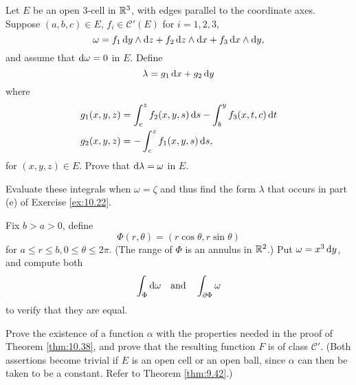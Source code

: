 \begin{myexercise}    
    \label{ex:10.27}
    Let $E$ be an open 3-cell in ${\protect\mathbb R}^3$, with edges parallel to the coordinate axes. 
    Suppose $(a, b, c) \in E$, $f_i \in \mathscr{C}'(E)$ for $i = 1, 2, 3$,
    \begin{equation*}
        \omega = 
        f_1 \d y \wedge \d z + 
        f_2 \d z \wedge \d x + 
        f_3 \d x \wedge \d y ,
    \end{equation*}
    and assume that $\d \omega = 0$ in $E$.
    Define 
    \begin{equation*}
        \lambda = g_1 \d x + g_2 \d y
    \end{equation*}
    where 
    \begin{align*}
        g_1(x,y,z) &= \int_{c}^{z} f_2(x,y,s) \d s - \int_{b}^{y} f_3(x,t,c) \d t \\
        g_2(x,y,z) &= -\int_{c}^{z} f_1(x,y,s) \d s ,
    \end{align*}
    for $(x, y, z) \in E$. 
    Prove that $\d \lambda = \omega$ in $E$.

    Evaluate these integrals when $\omega = \zeta$ and thus find the form $\lambda$ that occurs in part (e) of Exercise \ref{ex:10.22}.
\end{myexercise}


\begin{myexercise}    
    \label{ex:10.28}
    Fix $b > a > 0$, define
    \begin{equation*}
        \Phi(r, \theta) = (r \cos \theta, r \sin \theta)
    \end{equation*}
    for $a \leq r \leq b, 0 \leq \theta \leq 2\pi$. 
    (The range of $\Phi$ is an annulus in ${\protect\mathbb R}^2$.) 
    Put $\omega = x^3 \d y$,
    and compute both 
    \begin{equation*}
        \int_{\Phi} \d \omega 
        \quad \text{and} \quad 
        \int_{\partial \Phi} \omega 
    \end{equation*}
    to verify that they are equal.
\end{myexercise}


\begin{myexercise}    
    \label{ex:10.29}
    Prove the existence of a function $\alpha$ with the properties needed in the proof of Theorem \ref{thm:10.38}, 
    and prove that the resulting function $F$ is of class $\mathscr{C}'$. 
    (Both assertions become trivial if $E$ is an open cell or an open ball, 
    since $\alpha$ can then be taken to be a constant. 
    Refer to Theorem \ref{thm:9.42}.)
\end{myexercise}



